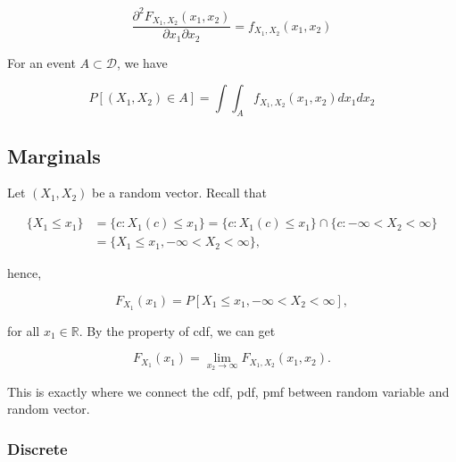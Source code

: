 \documentclass{article}
\begin{document}
            \begin{equation*}
                 \frac{\partial^{2} F_{X_{1}, X_{2}} (x_{1}, x_{2})}{\partial
                     x_{1} \partial x_{2}} = f_{X_{1}, X_{2}} (x_{1}, x_{2})
            \end{equation*}

            For an event $ A \subset \mathcal{D} $, we have

            \begin{equation*}
                 P [ (X_{1}, X_{2}) \in A ] = \int \int_{A} f_{X_{1}, X_{2}}
                     (x_{1}, x_{2}) d x_{1} d x_{2}
            \end{equation*}

        \subsection{Marginals}

            Let $ (X_{1}, X_{2}) $ be a random vector. Recall that

            \begin{align*}
                \{ X_{1} \leq x_{1} \} &= \{ c : X_{1}(c) \leq x_{1} \}
                    = \{ c: X_{1}(c) \leq x_{1} \} \cap \{ c: -\infty < X_{2} < \infty \} \\
                                       &= \{ X_{1} \leq x_{1}, -\infty < X_{2} < \infty \},
            \end{align*}

            hence,

            \begin{equation*}
                F_{X_{1}}(x_{1}) = P[ X_{1} \leq x_{1}, -\infty < X_{2} < \infty ],
            \end{equation*}

            for all $ x_{1} \in \mathbb{R} $. By the property of cdf, we can get

            \begin{equation*}
                 F_{X_{1}}(x_{1}) = \lim_{x_{2} \rightarrow \infty} F_{X_{1}, X_{2}} (x_{1}, x_{2}).
            \end{equation*}

            This is exactly where we connect the cdf, pdf, pmf between random
            variable and random vector.

            \subsubsection{Discrete}
\end{document}
